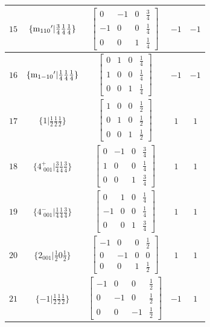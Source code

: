 \documentclass[fleqn,8pt]{jsarticle}
\begin{document}
\begin{longtable}{ccccc}
$ 15 $ & $ \{{\rm m}_{110}{}'|\frac{3}{4} \frac{1}{4} \frac{1}{4}\} $ & $ \begin{bmatrix} 0 & -1 & 0 & \frac{3}{4} \\ -1 & 0 & 0 & \frac{1}{4} \\ 0 & 0 & 1 & \frac{1}{4} \end{bmatrix} $ & $ -1 $ & $ -1 $ \\ \hline
$ 16 $ & $ \{{\rm m}_{1-10}{}'|\frac{1}{4} \frac{1}{4} \frac{1}{4}\} $ & $ \begin{bmatrix} 0 & 1 & 0 & \frac{1}{4} \\ 1 & 0 & 0 & \frac{1}{4} \\ 0 & 0 & 1 & \frac{1}{4} \end{bmatrix} $ & $ -1 $ & $ -1 $ \\ \hline
$ 17 $ & $ \{1|\frac{1}{2} \frac{1}{2} \frac{1}{2}\} $ & $ \begin{bmatrix} 1 & 0 & 0 & \frac{1}{2} \\ 0 & 1 & 0 & \frac{1}{2} \\ 0 & 0 & 1 & \frac{1}{2} \end{bmatrix} $ & $ 1 $ & $ 1 $ \\ \hline
$ 18 $ & $ \{4^{+}_{\,\,001}|\frac{3}{4} \frac{1}{4} \frac{3}{4}\} $ & $ \begin{bmatrix} 0 & -1 & 0 & \frac{3}{4} \\ 1 & 0 & 0 & \frac{1}{4} \\ 0 & 0 & 1 & \frac{3}{4} \end{bmatrix} $ & $ 1 $ & $ 1 $ \\ \hline
$ 19 $ & $ \{4^{-}_{\,\,001}|\frac{1}{4} \frac{1}{4} \frac{3}{4}\} $ & $ \begin{bmatrix} 0 & 1 & 0 & \frac{1}{4} \\ -1 & 0 & 0 & \frac{1}{4} \\ 0 & 0 & 1 & \frac{3}{4} \end{bmatrix} $ & $ 1 $ & $ 1 $ \\ \hline
$ 20 $ & $ \{2{}_{001}|\frac{1}{2} 0 \frac{1}{2}\} $ & $ \begin{bmatrix} -1 & 0 & 0 & \frac{1}{2} \\ 0 & -1 & 0 & 0 \\ 0 & 0 & 1 & \frac{1}{2} \end{bmatrix} $ & $ 1 $ & $ 1 $ \\ \hline
$ 21 $ & $ \{-1|\frac{1}{2} \frac{1}{2} \frac{1}{2}\} $ & $ \begin{bmatrix} -1 & 0 & 0 & \frac{1}{2} \\ 0 & -1 & 0 & \frac{1}{2} \\ 0 & 0 & -1 & \frac{1}{2} \end{bmatrix} $ & $ -1 $ & $ 1 $ \\ \hline

\end{longtable}
\end{document}
